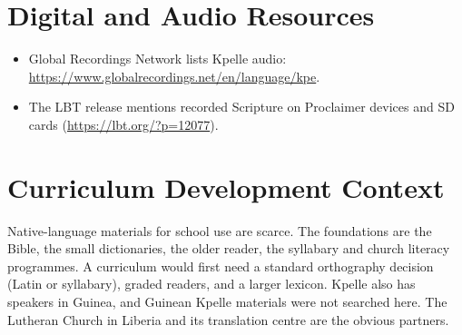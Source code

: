 \documentclass[12pt]{article}
\begin{document}
\section{Digital and Audio Resources}
\begin{itemize}
\item Global Recordings Network lists Kpelle audio: \url{https://www.globalrecordings.net/en/language/kpe}.
\item The LBT release mentions recorded Scripture on Proclaimer devices and SD cards (\url{https://lbt.org/?p=12077}).
\end{itemize}

\section{Curriculum Development Context}
Native-language materials for school use are scarce. The foundations are the Bible, the small dictionaries, the older reader, the syllabary and church literacy programmes. A curriculum would first need a standard orthography decision (Latin or syllabary), graded readers, and a larger lexicon. Kpelle also has speakers in Guinea, and Guinean Kpelle materials were not searched here. The Lutheran Church in Liberia and its translation centre are the obvious partners.
\end{document}
